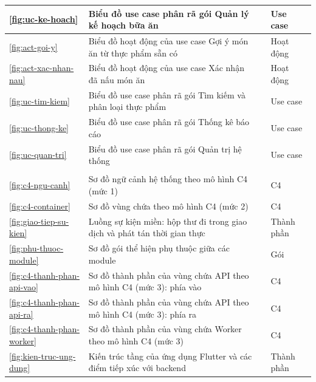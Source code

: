 {\begin{longtable}{|C{1.3cm}|L{\dimexpr{}\arrayrulewidth-1.3cm-5.6cm-2.4cm\relax}|L{5.6cm}|L{2.4cm}|}
\ref{fig:uc-ke-hoach} & Biểu đồ use case phân rã gói Quản lý kế hoạch bữa ăn &  & Use case\\ \hline
\ref{fig:act-goi-y} & Biểu đồ hoạt động của use case Gợi ý món ăn từ thực phẩm sẵn có &  & Hoạt động\\ \hline
\ref{fig:act-xac-nhan-nau} & Biểu đồ hoạt động của use case Xác nhận đã nấu món ăn &  & Hoạt động\\ \hline
\ref{fig:uc-tim-kiem} & Biểu đồ use case phân rã gói Tìm kiếm và phân loại thực phẩm &  & Use case\\ \hline
\ref{fig:uc-thong-ke} & Biểu đồ use case phân rã gói Thống kê báo cáo &  & Use case\\ \hline
\ref{fig:uc-quan-tri} & Biểu đồ use case phân rã gói Quản trị hệ thống &  & Use case\\ \hline
{}\\ \hline
\ref{fig:c4-ngu-canh} & Sơ đồ ngữ cảnh hệ thống theo mô hình C4 (mức 1) &  & C4\\ \hline
\ref{fig:c4-container} & Sơ đồ vùng chứa theo mô hình C4 (mức 2) &  & C4\\ \hline
\ref{fig:giao-tiep-su-kien} & Luồng sự kiện miền: hộp thư đi trong giao dịch và phát tán thời gian thực &  & Thành phần\\ \hline
\ref{fig:phu-thuoc-module} & Sơ đồ gói thể hiện phụ thuộc giữa các module &  & Gói\\ \hline
\ref{fig:c4-thanh-phan-api-vao} & Sơ đồ thành phần của vùng chứa API theo mô hình C4 (mức 3): phía vào &  & C4\\ \hline
\ref{fig:c4-thanh-phan-api-ra} & Sơ đồ thành phần của vùng chứa API theo mô hình C4 (mức 3): phía ra &  & C4\\ \hline
\ref{fig:c4-thanh-phan-worker} & Sơ đồ thành phần của vùng chứa Worker theo mô hình C4 (mức 3) &  & C4\\ \hline
\ref{fig:kien-truc-ung-dung} & Kiến trúc tầng của ứng dụng Flutter và các điểm tiếp xúc với backend &  & Thành phần\\ \hline

\end{longtable}}
